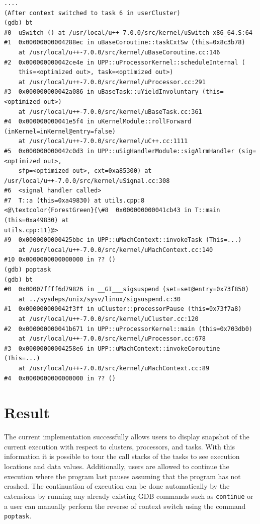 \begin{lstlisting}[caption={\text{poptask} command}, label={poptask}]
....
(After context switched to task 6 in userCluster)
(gdb) bt
#0  uSwitch () at /usr/local/u++-7.0.0/src/kernel/uSwitch-x86_64.S:64
#1  0x00000000004288ec in uBaseCoroutine::taskCxtSw (this=0x8c3b78)
    at /usr/local/u++-7.0.0/src/kernel/uBaseCoroutine.cc:146
#2  0x000000000042ce4e in UPP::uProcessorKernel::scheduleInternal (
    this=<optimized out>, task=<optimized out>)
    at /usr/local/u++-7.0.0/src/kernel/uProcessor.cc:291
#3  0x000000000042a086 in uBaseTask::uYieldInvoluntary (this=<optimized out>)
    at /usr/local/u++-7.0.0/src/kernel/uBaseTask.cc:361
#4  0x000000000041e5f4 in uKernelModule::rollForward (inKernel=inKernel@entry=false)
    at /usr/local/u++-7.0.0/src/kernel/uC++.cc:1111
#5  0x000000000042c0d3 in UPP::uSigHandlerModule::sigAlrmHandler (sig=<optimized out>,
    sfp=<optimized out>, cxt=0xa85300) at /usr/local/u++-7.0.0/src/kernel/uSignal.cc:308
#6  <signal handler called>
#7  T::a (this=0xa49830) at utils.cpp:8
<@\textcolor{ForestGreen}{\#8  0x000000000041cb43 in T::main (this=0xa49830) at
utils.cpp:11}@>
#9  0x0000000000425bbc in UPP::uMachContext::invokeTask (This=...)
    at /usr/local/u++-7.0.0/src/kernel/uMachContext.cc:140
#10 0x0000000000000000 in ?? ()
(gdb) poptask
(gdb) bt
#0  0x00007ffff6d79826 in __GI___sigsuspend (set=set@entry=0x73f850)
    at ../sysdeps/unix/sysv/linux/sigsuspend.c:30
#1  0x000000000042f3ff in uCluster::processorPause (this=0x73f7a8)
    at /usr/local/u++-7.0.0/src/kernel/uCluster.cc:120
#2  0x000000000041b671 in UPP::uProcessorKernel::main (this=0x703db0)
    at /usr/local/u++-7.0.0/src/kernel/uProcessor.cc:678
#3  0x00000000004258e6 in UPP::uMachContext::invokeCoroutine (This=...)
    at /usr/local/u++-7.0.0/src/kernel/uMachContext.cc:89
#4  0x0000000000000000 in ?? ()
\end{lstlisting}

\section{Result}
The current implementation successfully allows users to display snapshot of the
current execution with respect to clusters, processors, and tasks. With this
information it is possible to tour the call stacks of the tasks to see execution
locations and data values. Additionally, users are allowed to continue the execution where the
program last pauses assuming that the program has not crashed. The continuation
of execution can be done automatically by the extensions by running any already
existing GDB commands such as \verb|continue| or a user can manually
perform the reverse of context switch using the command \verb|poptask|.

